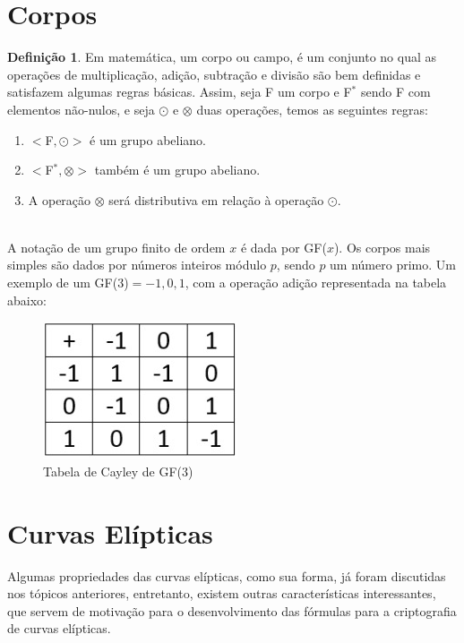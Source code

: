 \documentclass[14pt, oneside]{book}
\newcommand\tab[1][1cm]{\hspace*{#1}}
\theoremstyle{definition}
\newtheorem{defn}{Definição}
\begin{document}
            \section{Corpos}
                \begin{defn}Em matemática, um corpo ou campo, é um conjunto no qual as operações de multiplicação, adição, subtração e divisão são bem definidas e satisfazem algumas regras básicas. Assim, seja F um corpo e F$^\ast$ sendo F com elementos não-nulos, e seja $\odot$ e $\otimes$ duas operações, temos as seguintes regras:
                
               \begin{enumerate}
                   \item $<$F$,\odot>$ é um grupo abeliano. 
                   \item $<$F$^\ast, \otimes>$ também é um grupo abeliano. 
                   \item A operação $\otimes$ será distributiva em relação à operação $\odot$.
               \end{enumerate}
               \end{defn}
                \\
                \tab A notação de um grupo finito de ordem $x$ é dada por GF($x$). Os corpos mais simples são dados por números inteiros módulo $p$, sendo $p$ um número primo. Um exemplo de um GF($3$)$ = -1, 0, 1$, com a operação adição representada na tabela abaixo:
                
                \begin{figure}[!htb]
                    \centering
                    \includegraphics[scale=0.6]{tabela.png}
                    \caption{Tabela de Cayley de GF($3$)}
                    \label{Rotulo}
                \end{figure}
            
                
            \section{Curvas Elípticas}
                \tab Algumas propriedades das curvas elípticas, como sua forma, já foram discutidas nos tópicos anteriores, entretanto, existem outras características interessantes, que servem de motivação para o desenvolvimento das fórmulas para a criptografia de curvas elípticas.
                
\end{document}
